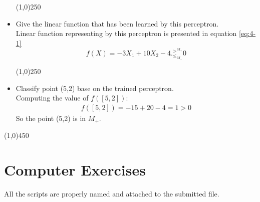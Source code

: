 \documentclass[12pt]{article}
\begin{document}
\begin{itemize}
\begin{center}
\line(1,0){250}
\end{center}
\item  Give the linear function that has been learned by this perceptron.\\
Linear function representing by this perceptron is presented in equation \eqref{eq:4-1}
\begin{equation}
f(X) = -3X_1 + 10 X_2 -4 .^{>^{M_+}}_{\leq_{M_-}} 0
\label{eq:4-1}
\end{equation}

\begin{center}
\line(1,0){250}
\end{center}
\item  Classify point (5,2) base on the trained perceptron.\\
Computing the value of $f([5,2])$:
\begin{align*}
f([5,2]) = -15 + 20 -4 = 1 > 0
\end{align*}
So the point (5,2) is in $M_+$.
\end{itemize}


\begin{center}
\line(1,0){450}
\end{center}

\section{Computer Exercises}
All the scripts are properly named and attached to the submitted file.
\end{document}
